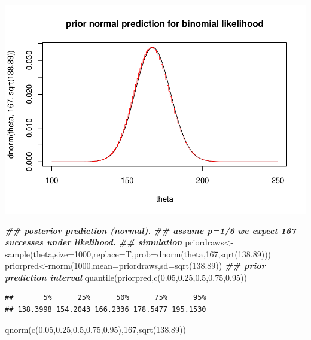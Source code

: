 \documentclass[
]{book}
\newenvironment{Shaded}{\begin{snugshade}}{\end{snugshade}}
\newcommand{\AttributeTok}[1]{\textcolor[rgb]{0.77,0.63,0.00}{#1}}
\newcommand{\DecValTok}[1]{\textcolor[rgb]{0.00,0.00,0.81}{#1}}
\newcommand{\DocumentationTok}[1]{\textcolor[rgb]{0.56,0.35,0.01}{\textbf{\textit{#1}}}}
\newcommand{\FloatTok}[1]{\textcolor[rgb]{0.00,0.00,0.81}{#1}}
\newcommand{\FunctionTok}[1]{\textcolor[rgb]{0.00,0.00,0.00}{#1}}
\newcommand{\NormalTok}[1]{#1}
\newcommand{\OtherTok}[1]{\textcolor[rgb]{0.56,0.35,0.01}{#1}}
\theoremstyle{definition}
\theoremstyle{definition}
\theoremstyle{definition}
\theoremstyle{definition}
\theoremstyle{remark}
\begin{document}
\includegraphics{_main_files/figure-latex/unnamed-chunk-13-1.pdf}

\begin{Shaded}
\begin{Highlighting}[]
  \DocumentationTok{\#\# posterior prediction (normal).}
     \DocumentationTok{\#\# assume p=1/6 we expect 167 successes under likelihood.}
\DocumentationTok{\#\# simulation     }
\NormalTok{     priordraws}\OtherTok{\textless{}{-}}\FunctionTok{sample}\NormalTok{(theta,}\AttributeTok{size=}\DecValTok{1000}\NormalTok{,}\AttributeTok{replace=}\NormalTok{T,}\AttributeTok{prob=}\FunctionTok{dnorm}\NormalTok{(theta,}\DecValTok{167}\NormalTok{,}\FunctionTok{sqrt}\NormalTok{(}\FloatTok{138.89}\NormalTok{)))}
\NormalTok{     priorpred}\OtherTok{\textless{}{-}}\FunctionTok{rnorm}\NormalTok{(}\DecValTok{1000}\NormalTok{,}\AttributeTok{mean=}\NormalTok{priordraws,}\AttributeTok{sd=}\FunctionTok{sqrt}\NormalTok{(}\FloatTok{138.89}\NormalTok{))}
     \DocumentationTok{\#\# prior prediction interval}
     \FunctionTok{quantile}\NormalTok{(priorpred,}\FunctionTok{c}\NormalTok{(}\FloatTok{0.05}\NormalTok{,}\FloatTok{0.25}\NormalTok{,}\FloatTok{0.5}\NormalTok{,}\FloatTok{0.75}\NormalTok{,}\FloatTok{0.95}\NormalTok{))}
\end{Highlighting}
\end{Shaded}

\begin{verbatim}
##       5%      25%      50%      75%      95% 
## 138.3998 154.2043 166.2336 178.5477 195.1530
\end{verbatim}

\begin{Shaded}
\begin{Highlighting}[]
     \FunctionTok{qnorm}\NormalTok{(}\FunctionTok{c}\NormalTok{(}\FloatTok{0.05}\NormalTok{,}\FloatTok{0.25}\NormalTok{,}\FloatTok{0.5}\NormalTok{,}\FloatTok{0.75}\NormalTok{,}\FloatTok{0.95}\NormalTok{),}\DecValTok{167}\NormalTok{,}\FunctionTok{sqrt}\NormalTok{(}\FloatTok{138.89}\NormalTok{))}
\end{Highlighting}
\end{Shaded}
\end{document}
